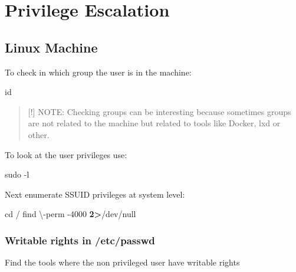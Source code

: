 \documentclass{assets/ipesethesis}
\newenvironment{Shaded}{\begin{snugshade}}{\end{snugshade}}
\newcommand{\BuiltInTok}[1]{#1}
\newcommand{\FunctionTok}[1]{\textcolor[rgb]{0.00,0.00,0.00}{#1}}
\newcommand{\NormalTok}[1]{#1}
\newcommand{\OperatorTok}[1]{\textcolor[rgb]{0.81,0.36,0.00}{\textbf{#1}}}
\begin{document}
\hypertarget{part-privilege-escalation}{%
\part{Privilege Escalation}\label{part-privilege-escalation}}

\hypertarget{linux-machine}{%
\chapter*{Linux Machine}\label{linux-machine}}

To check in which group the user is in the machine:

\begin{Shaded}
\begin{Highlighting}[]
\FunctionTok{id} 
\end{Highlighting}
\end{Shaded}

\begin{quote}
{[}!{]} NOTE: Checking groups can be interesting because sometimes groups are not related to the machine but related to tools like Docker, lxd or other.
\end{quote}

To look at the user privileges use:

\begin{Shaded}
\begin{Highlighting}[]
\FunctionTok{sudo}\NormalTok{ -l}
\end{Highlighting}
\end{Shaded}

Next enumerate SSUID privileges at system level:

\begin{Shaded}
\begin{Highlighting}[]
\BuiltInTok{cd}\NormalTok{ /}
\FunctionTok{find}\NormalTok{ \textbackslash{}-perm -4000 }\OperatorTok{2>}\NormalTok{/dev/null}
\end{Highlighting}
\end{Shaded}

\hypertarget{writable-rights-in-etcpasswd}{%
\section*{Writable rights in /etc/passwd}\label{writable-rights-in-etcpasswd}}

Find the tools where the non privileged user have writable rights
\end{document}
